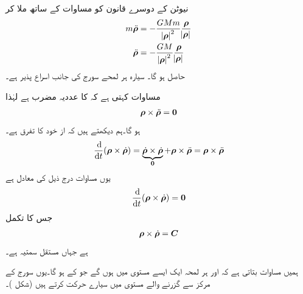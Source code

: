 نیوٹن کے دوسرے قانون   کو مساوات  کے ساتھ ملا کر
\begin{align}
m\ddot{{{\boldsymbol{\rho}}}}&=-\frac{GMm}{\abs{{{\boldsymbol{\rho}}}}^2}\frac{{{\boldsymbol{\rho}}}}{\abs{{{\boldsymbol{\rho}}}}}\nonumber\\
\ddot{{{\boldsymbol{\rho}}}}&=-\frac{GM}{\abs{{{\boldsymbol{\rho}}}}^2}\frac{{{\boldsymbol{\rho}}}}{\abs{{{\boldsymbol{\rho}}}}}\label{مساوات_سمتی_تفاعل_قوت_تجاذب_ب}
\end{align}
حاصل  ہو گا۔ سیارہ ہر لمحے  سورج کی جانب اسراع پذیر   ہے۔

مساوات  کہتی ہے کہ  کا عددیہ مضرب  ہے لہٰذا 
\begin{align}\label{مساوات_سمتی_تفاعل_قوت_تجاذب_پ}
{\ensuremath{{\boldsymbol{\rho}}}}\times\ddot{{{\boldsymbol{\rho}}}}={{\boldsymbol{0}}}
\end{align}
ہو گا۔ہم دیکھتے  ہیں کہ     از خود  کا تفرق ہے۔
\begin{align}\label{مساوات_سمتی_تفاعل_قوت_تجاذب_ت}
\frac{\dif}{\dif t}(\kvec{\rho}\times\dot{\kvec{\rho}})=\underbrace{\dot{\kvec{\rho}}\times \dot{\kvec{\rho}}}_{\kvec{0}}+\kvec{\rho}\times\ddot{\kvec{\rho}}=\kvec{\rho}\times\ddot{\kvec{\rho}}
\end{align}
یوں مساوات  درج ذیل کی معادل ہے
\begin{align}\label{مساوات_سمتی_تفاعل_قوت_تجاذب_ٹ}
\frac{\dif}{\dif t}(\kvec{\rho}\times\dot{\kvec{\rho}})=\kvec{0}
\end{align}
جس کا تکمل
\begin{align}\label{مساوات_سمتی_تفاعل_قوت_تجاذب_ث}
{\ensuremath{{\boldsymbol{\rho}}}}\times\dot{{{\boldsymbol{\rho}}}}={{\boldsymbol{C}}}
\end{align}
ہے جہاں  مستقل سمتیہ ہے۔

ہمیں مساوات  بتاتی ہے کہ  اور  ہر لمحہ ایک ایسے مستوی میں ہوں گے جو  کے   ہو گا۔یوں  سورج کے مرکز سے گزرنے والے مستوی میں سیارے  حرکت کرتے ہیں (شکل )۔

